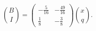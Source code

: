\[\binom BI=\begin{pmatrix}-\frac{5}{16}&-\frac{49}{16}\\\frac{1}{8}&-\frac{3}{8}\end{pmatrix}\binom xq.\]
